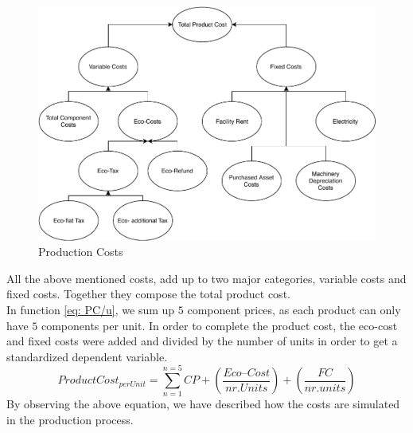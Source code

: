 \begin{figure}[ht]
	\centering
		\includegraphics[scale=0.55]{images/ProductCost.pdf}
	\caption{Production Costs}
	\label{fig:productionCosts}
\end{figure}
All the above mentioned costs, add up to two major categories, variable costs and fixed costs. Together they compose the total product cost.\\
 In function \ref{eq: PC/u}, we sum up $5$ component prices, as each product can only have $5$ components per unit. In order to complete the product cost, the eco-cost and fixed costs were added and divided by the number of units in order to get a standardized dependent variable.
\begin{equation}
	Product Cost_{per Unit}= \sum_{n=1}^{n=5}CP + (\frac{Eco–Cost}{nr. Units}) + (\frac{FC}{nr. units}) 
	\label{eq: PC/u}
\end{equation}
By observing the above equation, we have described how the costs are simulated in the production process. 

